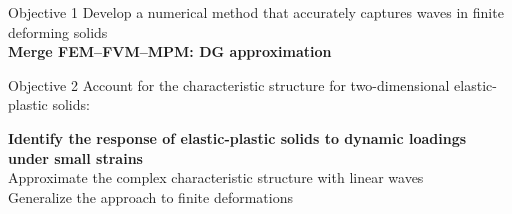 \begin{withoutheadline}
\begin{frame}{\text{  }}
\begin{overprint}
      \begin{block}{Objective 1}
        Develop a numerical method that accurately captures waves in finite deforming solids \\
        \textbf{Merge FEM--FVM--MPM: DG approximation}
      \end{block}
      \begin{block}{Objective 2}
        Account for the characteristic structure for two-dimensional elastic-plastic solids:\\
        \begin{footnotesize}
          \vspace{-0.85cm}
          \begin{center}
            \textbf{Identify the response of elastic-plastic solids to dynamic loadings under small strains}\\
            Approximate the complex characteristic structure with linear waves\\
            Generalize the approach to finite deformations 
          \end{center}          
        \end{footnotesize}
      \end{block}
      \vspace{-0.3cm}

  \end{overprint}
\end{frame}
\end{withoutheadline}




